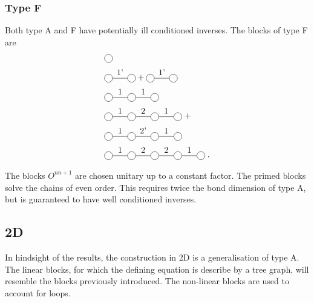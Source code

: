 \documentclass[twocolumn]{article}
\newcounter{a}
\newcounter{b}
\begin{document}
\subsubsection{Type F}
Both type A and F have potentially ill conditioned inverses. The blocks of type F are
\begin{subequations}
    \begin{align}
         & \mpob{1}{ {,}  }{}{}{}{{,,}}                                          \\
         & \mpob{2}{ {,"1'",}  }{}{}{}{{,,}}+  \mpob{2}{ {,"1'",}  }{}{}{}{{,,}} \\
         & \mpob{3}{ {,"1","1",}  }{}{}{}{{,,,}}                                 \\
         & \mpob{4}{ {,"1","2","1",}  }{}{}{}{{,,,,,}} \; +  \nonumber           \\
         & \mpob{4}{ {,"1","2'","1",}  }{}{}{}{{,,,,,}}                          \\
         & \mpob{5}{ {,"1","2","2","1",}  }{}{}{}{{,,,,,}} \;.
    \end{align}
\end{subequations}

The blocks $O^{n n+1}$ are chosen unitary up to a constant factor. The primed blocks solve the chains of even order. This requires twice the bond dimension of type A, but is guaranteed to have well conditioned inverses.

\subsection{2D}
In hindsight of the results, the construction in 2D is a generalisation of type A. The linear blocks, for which the defining equation is describe by a tree graph, will resemble the blocks previously introduced. The non-linear blocks are used to account for loops.
\end{document}
